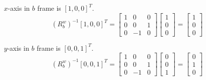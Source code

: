 \documentclass[answers]{exam}
\begin{document}
\begin{questions}
\begin{parts}
\begin{solution}
            $x$-axis in $b$ frame is $[1, 0, 0]^T$.
            \begin{equation*}
                (R^w_b)^{-1} [1, 0, 0]^T = \begin{bmatrix}
                    1 & 0  & 0 \\
                    0 & 0  & 1 \\
                    0 & -1 & 0
                \end{bmatrix}
                \begin{bmatrix}
                    1 \\
                    0 \\
                    0
                \end{bmatrix}
                = \begin{bmatrix}
                    1 \\
                    0 \\
                    0
                \end{bmatrix}
            \end{equation*}

            $y$-axis in $b$ frame is $[0, 0, 1]^T$.
            \begin{equation*}
                (R^w_b)^{-1} [0, 0, 1]^T = \begin{bmatrix}
                    1 & 0  & 0 \\
                    0 & 0  & 1 \\
                    0 & -1 & 0
                \end{bmatrix}
                \begin{bmatrix}
                    0 \\
                    0 \\
                    1
                \end{bmatrix}
                = \begin{bmatrix}
                    0 \\
                    1 \\
                    0
                \end{bmatrix}
            \end{equation*}


\end{solution}
\end{parts}
\end{questions}
\end{document}
